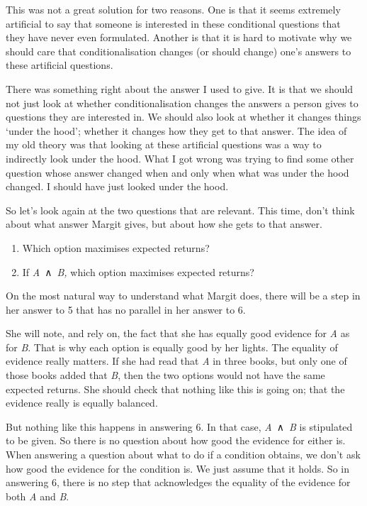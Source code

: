 \documentclass[
  10pt,
  letterpaper,
  twoside]{scrbook}
\providecommand{\tightlist}{%
  \setlength{\itemsep}{0pt}\setlength{\parskip}{0pt}}\usepackage{longtable,booktabs,array}
\begin{document}
This was not a great solution for two reasons. One is that it seems
extremely artificial to say that someone is interested in these
conditional questions that they have never even formulated. Another is
that it is hard to motivate why we should care that conditionalisation
changes (or should change) one's answers to these artificial questions.

There was something right about the answer I used to give. It is that we
should not just look at whether conditionalisation changes the answers a
person gives to questions they are interested in. We should also look at
whether it changes things `under the hood'; whether it changes how they
get to that answer. The idea of my old theory was that looking at these
artificial questions was a way to indirectly look under the hood. What I
got wrong was trying to find some other question whose answer changed
when and only when what was under the hood changed. I should have just
looked under the hood.

So let's look again at the two questions that are relevant. This time,
don't think about what answer Margit gives, but about how she gets to
that answer.

\begin{enumerate}
\def\labelenumi{\arabic{enumi}.}
\setcounter{enumi}{4}
\tightlist
\item
  Which option maximises expected returns?
\item
  If \emph{A}~∧~\emph{B,} which option maximises expected returns?
\end{enumerate}

On the most natural way to understand what Margit does, there will be a
step in her answer to 5 that has no parallel in her answer to 6.

She will note, and rely on, the fact that she has equally good evidence
for \emph{A} as for \emph{B}. That is why each option is equally good by
her lights. The equality of evidence really matters. If she had read
that \emph{A} in three books, but only one of those books added that
\emph{B}, then the two options would not have the same expected returns.
She should check that nothing like this is going on; that the evidence
really is equally balanced.

But nothing like this happens in answering 6. In that case,
\emph{A}~∧~\emph{B} is stipulated to be given. So there is no question
about how good the evidence for either is. When answering a question
about what to do if a condition obtains, we don't ask how good the
evidence for the condition is. We just assume that it holds. So in
answering 6, there is no step that acknowledges the equality of the
evidence for both \emph{A} and \emph{B}.
\end{document}
